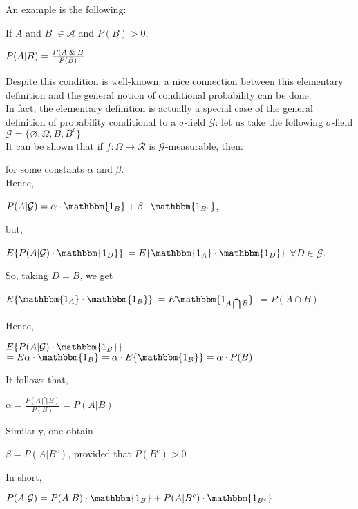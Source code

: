 An example is the following:
\begin{example}
    If $A$ and $B$ $\in \mathcal{A}$ and $P(B)>0$,
    \begin{center}
        $P(A|B) = \frac{P(A \And B}{P(B)}$
    \end{center}
    Despite this condition is well-known, a nice connection between this elementary definition and the general notion of conditional probability can be done.\\
    In fact, the elementary definition is actually a special case of the general definition of probability conditional to a $\sigma$-field $\mathcal{G}$: let us take the following $\sigma$-field $\mathcal{G}= \{\varnothing, \Omega, B, B^c \}$\\
    It can be shown that if $f: \Omega \rightarrow \mathcal{R}$ is $\mathcal{G}$-measurable, then:

for some constants $\alpha$ and $\beta$.\\
Hence, 
\begin{center}
    $P(A|\mathcal{G})= \alpha \cdot \mathbbm{1_B} + \beta \cdot \mathbbm{1_{B^c}}$,
\end{center}
but,
\begin{center}
    $E \{P(A|\mathcal{G})\cdot \mathbbm{1_D}\}$ $= E\{\mathbbm{1_A}\cdot\mathbbm{1_D}\}$ $\forall D \in \mathcal{G}$.
\end{center}
So, taking $D=B$, we get
\begin{center}
    $E\{\mathbbm{1_A}\cdot \mathbbm{1_B}\}$ $=E{\mathbbm\{1_{A \bigcap B }\}}$ $=P(A \cap B)$ 
\end{center}
Hence, 
\begin{center}
    $E \{P(A|\mathcal{G})\cdot \mathbbm{1_B}\}$ $=E{\alpha \cdot \mathbbm{1_B}} = \alpha \cdot E\{\mathbbm{1_B}\} = \alpha \cdot P(B)$
\end{center}
It follows that, 
\begin{center}
    $\alpha = \frac{P(A \bigcap B)}{P(B)}= P(A|B)$
\end{center}
Similarly, one obtain 
\begin{center}
    $\beta = P(A | B^c)$, provided that $P(B^c) > 0$
\end{center}
In short,
\begin{center}
    $P(A|\mathcal{G}) = P(A|B) \cdot \mathbbm{1_B} + P(A|B^c) \cdot \mathbbm{1_{B^c}} $
\end{center}
\end{example}

